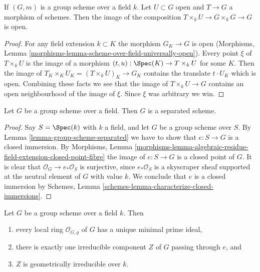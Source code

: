 \begin{lemma}
\label{lemma-group-scheme-over-field-translate-open}
If $(G, m)$ is a group scheme over a field $k$. Let $U \subset G$
open and $T \to G$ a morphism of schemes. Then the image of the
composition $T \times_k U \to G \times_k G \to G$ is open.
\end{lemma}

\begin{proof}
For any field extension $k \subset K$ the morphism $G_K \to G$ is open
(Morphisms, Lemma \ref{morphisms-lemma-scheme-over-field-universally-open}).
Every point $\xi$ of $T \times_k U$ is the image of a morphism
$(t, u) : \Spec(K) \to T \times_k U$ for some $K$. Then the image of
$T_K \times_K U_K = (T \times_k U)_K \to G_K$ contains the translate
$t \cdot U_K$ which is open. Combining these facts we see that the
image of $T \times_k U \to G$ contains an open neighbourhood of
the image of $\xi$. Since $\xi$ was arbitrary we win.
\end{proof}

\begin{lemma}
\label{lemma-group-scheme-over-field-separated}
Let $G$ be a group scheme over a field.
Then $G$ is a separated scheme.
\end{lemma}

\begin{proof}
Say $S = \Spec(k)$ with $k$ a field, and let $G$ be a group scheme
over $S$. By
Lemma \ref{lemma-group-scheme-separated}
we have to show that $e : S \to G$ is a closed immersion. By
Morphisms, Lemma
\ref{morphisms-lemma-algebraic-residue-field-extension-closed-point-fibre}
the image of $e : S \to G$ is a closed point of $G$.
It is clear that $\mathcal{O}_G \to e_*\mathcal{O}_S$ is surjective,
since $e_*\mathcal{O}_S$ is a skyscraper sheaf supported at the neutral
element of $G$ with value $k$. We conclude that $e$ is a closed immersion by
Schemes, Lemma \ref{schemes-lemma-characterize-closed-immersions}.
\end{proof}

\begin{lemma}
\label{lemma-group-scheme-field-geometrically-irreducible}
Let $G$ be a group scheme over a field $k$.
Then
\begin{enumerate}
\item every local ring $\mathcal{O}_{G, g}$ of $G$ has a unique
minimal prime ideal,
\item there is exactly one irreducible component $Z$ of $G$
passing through $e$, and
\item $Z$ is geometrically irreducible over $k$.
\end{enumerate}
\end{lemma}

